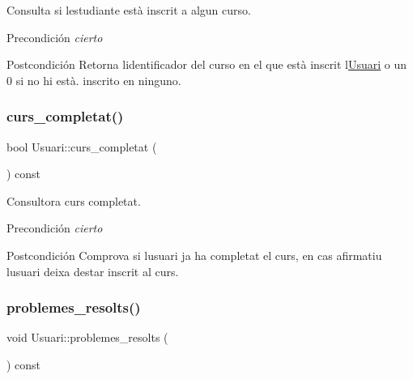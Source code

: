 Consulta si l\textquotesingle{}estudiante està inscrit a algun curso. 

\begin{DoxyPrecond}{Precondición}
{\itshape cierto} 
\end{DoxyPrecond}
\begin{DoxyPostcond}{Postcondición}
Retorna l\textquotesingle{}identificador del curso en el que està inscrit l\textquotesingle{}\mbox{\hyperlink{class_usuari}{Usuari}} o un 0 si no hi està. inscrito en ninguno. 
\end{DoxyPostcond}
\mbox{\label{class_usuari_a3cb6bb4ab49c3f858f3588c77af11527}} 
\subsubsection{\texorpdfstring{curs\+\_\+completat()}{curs\_completat()}}
{\footnotesize\ttfamily bool Usuari\+::curs\+\_\+completat (\begin{DoxyParamCaption}{ }\end{DoxyParamCaption}) const}



Consultora curs completat. 

\begin{DoxyPrecond}{Precondición}
{\itshape cierto} 
\end{DoxyPrecond}
\begin{DoxyPostcond}{Postcondición}
Comprova si l\textquotesingle{}usuari ja ha completat el curs, en cas afirmatiu l\textquotesingle{}usuari deixa d\textquotesingle{}estar inscrit al curs. 
\end{DoxyPostcond}
\mbox{\label{class_usuari_a3ef9f5ec04fe13ecfaf6d2f02bcd30bd}} 
\subsubsection{\texorpdfstring{problemes\+\_\+resolts()}{problemes\_resolts()}}
{\footnotesize\ttfamily void Usuari\+::problemes\+\_\+resolts (\begin{DoxyParamCaption}{ }\end{DoxyParamCaption}) const}



